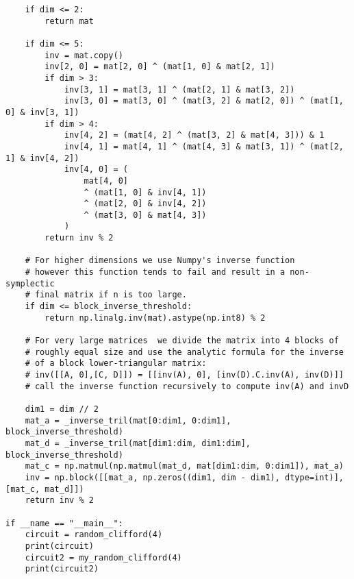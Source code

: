 \documentclass[8pt]{article}
\begin{document}
\begin{appendices}
\begin{verbatim}
    if dim <= 2:
        return mat

    if dim <= 5:
        inv = mat.copy()
        inv[2, 0] = mat[2, 0] ^ (mat[1, 0] & mat[2, 1])
        if dim > 3:
            inv[3, 1] = mat[3, 1] ^ (mat[2, 1] & mat[3, 2])
            inv[3, 0] = mat[3, 0] ^ (mat[3, 2] & mat[2, 0]) ^ (mat[1, 0] & inv[3, 1])
        if dim > 4:
            inv[4, 2] = (mat[4, 2] ^ (mat[3, 2] & mat[4, 3])) & 1
            inv[4, 1] = mat[4, 1] ^ (mat[4, 3] & mat[3, 1]) ^ (mat[2, 1] & inv[4, 2])
            inv[4, 0] = (
                mat[4, 0]
                ^ (mat[1, 0] & inv[4, 1])
                ^ (mat[2, 0] & inv[4, 2])
                ^ (mat[3, 0] & mat[4, 3])
            )
        return inv % 2

    # For higher dimensions we use Numpy's inverse function
    # however this function tends to fail and result in a non-symplectic
    # final matrix if n is too large.
    if dim <= block_inverse_threshold:
        return np.linalg.inv(mat).astype(np.int8) % 2

    # For very large matrices  we divide the matrix into 4 blocks of
    # roughly equal size and use the analytic formula for the inverse
    # of a block lower-triangular matrix:
    # inv([[A, 0],[C, D]]) = [[inv(A), 0], [inv(D).C.inv(A), inv(D)]]
    # call the inverse function recursively to compute inv(A) and invD

    dim1 = dim // 2
    mat_a = _inverse_tril(mat[0:dim1, 0:dim1], block_inverse_threshold)
    mat_d = _inverse_tril(mat[dim1:dim, dim1:dim], block_inverse_threshold)
    mat_c = np.matmul(np.matmul(mat_d, mat[dim1:dim, 0:dim1]), mat_a)
    inv = np.block([[mat_a, np.zeros((dim1, dim - dim1), dtype=int)], [mat_c, mat_d]])
    return inv % 2

if __name == "__main__":
    circuit = random_clifford(4)
    print(circuit)
    circuit2 = my_random_clifford(4)
    print(circuit2)
\end{verbatim}

\end{appendices}
\end{document}
